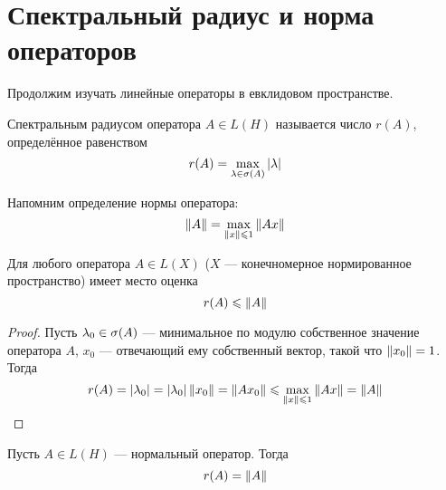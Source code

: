 \section{Спектральный радиус и норма операторов}
Продолжим изучать линейные операторы в евклидовом пространстве.

\begin{definition}
    Спектральным радиусом оператора $A\in L(H)$ 
    называется число $r(A)$, определённое равенством
    \[ r(A) = \max_{\lambda \in \operatorname{\sigma}(A)} \left|\lambda\right| \]
\end{definition}

Напомним определение нормы оператора:
\[ \left\|A\right\| = \max_{\left\|x\right\| \leqslant 1} \left\|Ax\right\| \]

\begin{lemma}\label{le:radiusapprox}
    Для любого оператора $A \in L(X)$ ($X$ --- конечномерное нормированное
    пространство) имеет место оценка
    \[ r(A) \leqslant \left\|A\right\| \]
\end{lemma}

\begin{proof}
    Пусть $\lambda_0 \in \operatorname{\sigma}(A)$ --- минимальное по модулю собственное
    значение оператора $A$, $x_0$ --- отвечающий ему собственный вектор, такой
    что $\left\|x_0\right\| = 1$. Тогда
    \[ r(A) = \left|\lambda_0\right| = \left|\lambda_0\right| \left\|x_0\right\| = \left\|Ax_0\right\| \leqslant
    \max_{\left\|x\right\| \leqslant 1} \left\|Ax\right\| = \left\|A\right\| \]
\end{proof}

\begin{theorem}\label{th:normalradius}
    Пусть $A \in L(H)$ --- нормальный оператор. Тогда
    \[ r(A) = \left\|A\right\| \]
\end{theorem}

